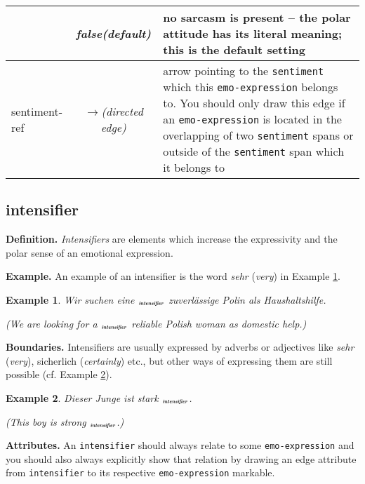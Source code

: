 \documentclass[11pt,a4paper]{article}
\newlength{\clmnwidth}
\theoremstyle{mytheoremstyle}
\newtheorem{exmp}{Example}[section]
\newcommand{\mtag}[2]{{\upshape[\emph{#2}\upshape]$_{\textrm{\bfseries\emph{\tiny
        #1}}}$}}
\newcommand{\intensifier}[2][]{\mtag{in\-ten\-si\-fier\ifstrempty{#1}{}{:#1}}{#2}}
\begin{document}
\begin{center}
\begin{table}[ht]
\begin{tabular}{|l|c|p{0.935\clmnwidth}|}
      & \textit{false\newline(default)} & no sarcasm is present -- the
      polar attitude has its literal meaning; this is the default
      setting\\\hline


      sentiment-ref & \textit{$\longrightarrow$\newline(directed
        edge)} & arrow pointing to the \texttt{sentiment} which this
      \texttt{emo-expression} belongs to.  You should only draw this
      edge if an \texttt{emo-expression} is located in the overlapping
      of two \texttt{sentiment} spans or outside of the
      \texttt{sentiment} span which it belongs to\\\hline
    \end{tabular}
    \label{tbl:emo-expression}
  \end{table}
\end{center}

\subsection{intensifier}
\noindent\textbf{Definition.} \emph{Intensifiers} are elements which increase
the expressivity and the polar sense of an emotional expression.

\noindent\textbf{Example.} An example of an intensifier is the word
\textit{sehr} (\textit{very}) in Example \ref{exmp:intensifier}.
\begin{exmp}
  Wir suchen eine \intensifier{sehr} zuverl\"assige Polin als
  Haushaltshilfe.

  (We are looking for a \intensifier{very} reliable Polish woman as
  domestic help.)\label{exmp:intensifier}
\end{exmp}
\noindent\textbf{Boundaries.} Intensifiers are usually expressed by
adverbs or adjectives like \textit{sehr} (\textit{very}), sicherlich
(\textit{certainly}) etc., but other ways of expressing them are still
possible (cf. Example \ref{exmp:intensifier-comp}).
\begin{exmp}
  Dieser Junge ist stark \intensifier{wie ein Pferd}.

  (This boy is strong \intensifier{as a
    horse}.)\label{exmp:intensifier-comp}
\end{exmp}

\noindent\textbf{Attributes.} An \texttt{intensifier} should always
relate to some \texttt{emo-expression} and you should also always
explicitly show that relation by drawing an edge attribute from
\texttt{intensifier} to its respective \texttt{emo-expression}
markable.
\end{document}
